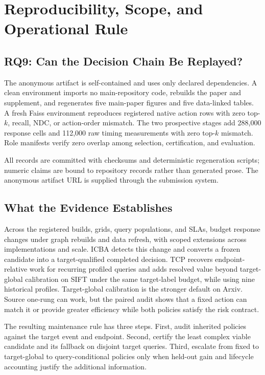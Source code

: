 \section{Reproducibility, Scope, and Operational Rule}
\label{sec:discussion}

\subsection{RQ9: Can the Decision Chain Be Replayed?}
The anonymous artifact is self-contained and uses only declared dependencies. A clean environment imports no main-repository code, rebuilds the paper and supplement, and regenerates five main-paper figures and five data-linked tables. A fresh Faiss environment reproduces registered native action rows with zero top-$k$, recall, NDC, or action-order mismatch. The two prospective stages add 288,000 response cells and 112,000 raw timing measurements with zero top-$k$ mismatch. Role manifests verify zero overlap among selection, certification, and evaluation.

All records are committed with checksums and deterministic regeneration scripts; numeric claims are bound to repository records rather than generated prose. The anonymous artifact URL is supplied through the submission system.

\subsection{What the Evidence Establishes}
Across the registered builds, grids, query populations, and SLAs, budget response changes under graph rebuilds and data refresh, with scoped extensions across implementations and scale. ICBA detects this change and converts a frozen candidate into a target-qualified completed decision. TCP recovers endpoint-relative work for recurring profiled queries and adds resolved value beyond target-global calibration on SIFT under the same target-label budget, while using nine historical profiles. Target-global calibration is the stronger default on Arxiv. Source one-rung can work, but the paired audit shows that a fixed action can match it or provide greater efficiency while both policies satisfy the risk contract.

The resulting maintenance rule has three steps. First, audit inherited policies against the target event and endpoint. Second, certify the least complex viable candidate and its fallback on disjoint target queries. Third, escalate from fixed to target-global to query-conditional policies only when held-out gain and lifecycle accounting justify the additional information.

